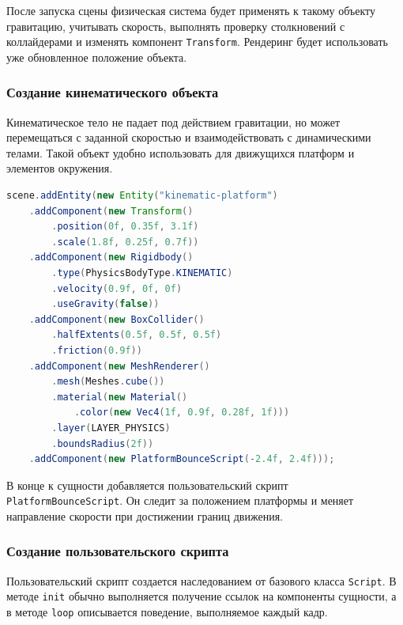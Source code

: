 После запуска сцены физическая система будет применять к такому объекту гравитацию, учитывать скорость, выполнять проверку столкновений с коллайдерами и изменять компонент \texttt{Transform}. Рендеринг будет использовать уже обновленное положение объекта.

\subsubsection{Создание кинематического объекта}

Кинематическое тело не падает под действием гравитации, но может перемещаться с заданной скоростью и взаимодействовать с динамическими телами. Такой объект удобно использовать для движущихся платформ и элементов окружения.

\begin{lstlisting}[language=Java,caption={Создание кинематической платформы}]
scene.addEntity(new Entity("kinematic-platform")
    .addComponent(new Transform()
        .position(0f, 0.35f, 3.1f)
        .scale(1.8f, 0.25f, 0.7f))
    .addComponent(new Rigidbody()
        .type(PhysicsBodyType.KINEMATIC)
        .velocity(0.9f, 0f, 0f)
        .useGravity(false))
    .addComponent(new BoxCollider()
        .halfExtents(0.5f, 0.5f, 0.5f)
        .friction(0.9f))
    .addComponent(new MeshRenderer()
        .mesh(Meshes.cube())
        .material(new Material()
            .color(new Vec4(1f, 0.9f, 0.28f, 1f)))
        .layer(LAYER_PHYSICS)
        .boundsRadius(2f))
    .addComponent(new PlatformBounceScript(-2.4f, 2.4f)));
\end{lstlisting}

В конце к сущности добавляется пользовательский скрипт \texttt{PlatformBounceScript}. Он следит за положением платформы и меняет направление скорости при достижении границ движения.

\subsubsection{Создание пользовательского скрипта}

Пользовательский скрипт создается наследованием от базового класса \texttt{Script}. В методе \texttt{init} обычно выполняется получение ссылок на компоненты сущности, а в методе \texttt{loop} описывается поведение, выполняемое каждый кадр.


